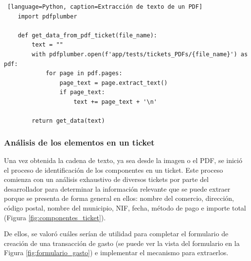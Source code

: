 \begin{lstlisting} [language=Python, caption=Extracción de texto de un PDF]
    import pdfplumber

    def get_data_from_pdf_ticket(file_name):
        text = ""
        with pdfplumber.open(f'app/tests/tickets_PDFs/{file_name}') as pdf:
            for page in pdf.pages:
                page_text = page.extract_text()
                if page_text:
                    text += page_text + '\n'
        
        return get_data(text)
\end{lstlisting}

\subsubsection{Análisis de los elementos en un ticket}
Una vez obtenida la cadena de texto, ya sea desde la imagen o el PDF, se inició el proceso de identificación de los componentes en un ticket. Este proceso comienza con un análisis exhaustivo de diversos tickets por parte del desarrollador para determinar la información relevante que se puede extraer porque se presenta de forma general en ellos: nombre del comercio, dirección, código postal, nombre del municipio, NIF, fecha, método de pago e importe total (Figura \ref{fig:componentes_ticket}).

De ellos, se valoró cuáles serían de utilidad para completar el formulario de creación de una transacción de gasto (se puede ver la vista del formulario en la Figura \ref{fig:formulario_gasto}) e implementar el mecanismo para extraerlos.

